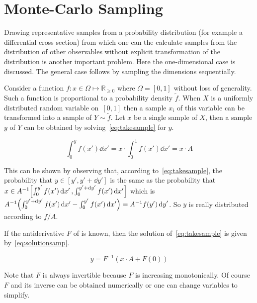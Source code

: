 
\section{Monte-Carlo Sampling}%
\label{sec:mcsamp}

Drawing representative samples from a probability distribution (for
example a differential cross section) from which one can the calculate
samples from the distribution of other observables without explicit
transformation of the distribution is another important problem. Here
the one-dimensional case is discussed. The general case follows by
sampling the dimensions sequentially.

Consider a function \(f\colon x\in\Omega\mapsto\mathbb{R}_{\geq 0}\)
where \(\Omega = [0, 1]\) without loss of generality. Such a function
is proportional to a probability density \(\tilde{f}\). When \(X\) is
a uniformly distributed random variable on~\([0, 1]\) then a sample
\({x_i}\) of this variable can be transformed into a sample of
\(Y\sim\tilde{f}\). Let \(x\) be a single sample of \(X\), then a
sample \(y\) of \(Y\) can be obtained by solving~\eqref{eq:takesample}
for \(y\).

\begin{equation}
  \label{eq:takesample}
  \int_{0}^{y}f(x')\dd{x'} = x\cdot\int_0^1f(x')\dd{x'} = x\cdot A
\end{equation}

This can be shown by observing that, according
to~\eqref{eq:takesample}, the probability that
\(y\in[y', y'+\dd{y}']\) is the same as the probability that
\(x\in A^{-1}\qty[\int_{0}^{y'}f(x')\dd{x'},
\int_{0}^{y'+\dd{y}'}f(x')\dd{x'}]\) which is
\(A^{-1}\qty(\int_{0}^{y'+\dd{y}'}f(x')\dd{x'} -
\int_{0}^{y'}f(x')\dd{x'}) = A^{-1} f(y')\dd{y}'\). So \(y\) is really
distributed according to \(f/A\).

If the antiderivative \(F\) of is known, then the solution
of~\eqref{eq:takesample} is given by~\eqref{eq:solutionsamp}.

\begin{equation}
  \label{eq:solutionsamp}
  y = F^{-1}(x\cdot A + F(0))
\end{equation}

Note that \(F\) is always invertible because \(F\) is
increasing monotonically. Of course \(F\) and its inverse can be
obtained numerically or one can change variables to simplify.


